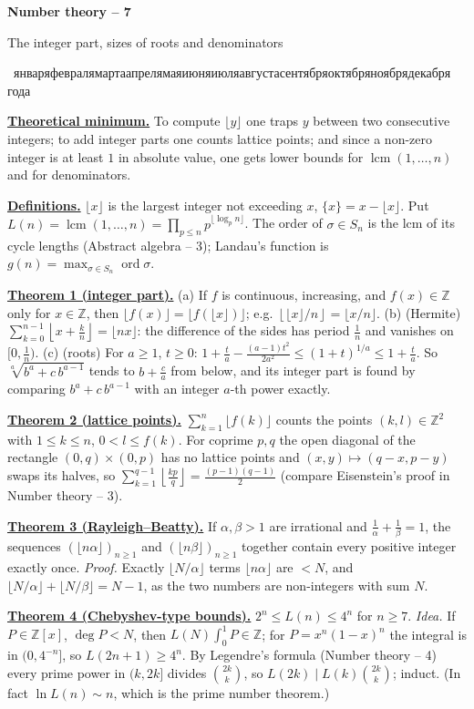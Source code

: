 \documentclass[11pt,a4paper]{article}
\newcommand{\head}[1]{\par\medskip\noindent\textbf{\underline{#1}}\quad}
\newcommand{\rudate}{\number\day~\ifcase\month\or января\or февраля\or марта\or апреля\or мая\or июня\or июля\or августа\or сентября\or октября\or ноября\or декабря\fi~\number\year~года}
\newcommand{\sheettitle}[3]{%
  \begin{center}
  {\huge\bfseries #1\par}\vspace{1.2em}
  {\Large #2\par}\vspace{0.8em}
  \if\relax\detokenize{#3}\relax\else{\Large #3\par}\vspace{0.8em}\fi
  {\foreignlanguage{russian}{\rudate}\par}
  \end{center}\vspace{0.5em}}
\newcommand{\fl}[1]{\left\lfloor #1\right\rfloor}
\DeclareMathOperator{\lcm}{lcm}
\DeclareMathOperator{\ord}{ord}
\begin{document}
\sheettitle{Number theory -- 7}{The integer part, sizes of roots and denominators}{}

\head{Theoretical minimum.} To compute $\lfloor y\rfloor$ one traps $y$ between two
consecutive integers; to add integer parts one counts lattice points; and since a non-zero
integer is at least $1$ in absolute value, one gets lower bounds for $\lcm(1,\dots,n)$ and
for denominators.

\head{Definitions.} $\lfloor x\rfloor$ is the largest integer not exceeding $x$,
$\{x\}=x-\lfloor x\rfloor$. Put $L(n)=\lcm(1,\dots,n)=\prod_{p\leqslant n}p^{\lfloor\log_p n\rfloor}$.
The order of $\sigma\in S_n$ is the lcm of its cycle lengths (Abstract algebra -- 3);
Landau's function is $g(n)=\max_{\sigma\in S_n}\ord\sigma$.

\head{Theorem 1 (integer part).} (a) If $f$ is continuous, increasing, and $f(x)\in\mathbb Z$
only for $x\in\mathbb Z$, then $\lfloor f(x)\rfloor=\lfloor f(\lfloor x\rfloor)\rfloor$; e.g.
$\fl{\lfloor x\rfloor/n}=\lfloor x/n\rfloor$.
(b) (Hermite) $\sum_{k=0}^{n-1}\fl{x+\frac kn}=\lfloor nx\rfloor$: the difference of the sides
has period $\frac1n$ and vanishes on $[0,\frac1n)$.
(c) (roots) For $a\geqslant1$, $t\geqslant0$:
$1+\frac ta-\frac{(a-1)t^2}{2a^2}\leqslant(1+t)^{1/a}\leqslant1+\frac ta$. So
$\sqrt[a]{b^a+c\,b^{a-1}}$ tends to $b+\frac ca$ from below, and its integer part is found by
comparing $b^a+c\,b^{a-1}$ with an integer $a$-th power exactly.

\head{Theorem 2 (lattice points).} $\sum_{k=1}^{n}\lfloor f(k)\rfloor$ counts the points
$(k,l)\in\mathbb Z^2$ with $1\leqslant k\leqslant n$, $0<l\leqslant f(k)$. For coprime $p,q$ the
open diagonal of the rectangle $(0,q)\times(0,p)$ has no lattice points and
$(x,y)\mapsto(q-x,p-y)$ swaps its halves, so
$\sum_{k=1}^{q-1}\fl{\frac{kp}q}=\frac{(p-1)(q-1)}2$ (compare Eisenstein's proof in Number
theory -- 3).

\head{Theorem 3 (Rayleigh--Beatty).} If $\alpha,\beta>1$ are irrational and
$\frac1\alpha+\frac1\beta=1$, the sequences $(\lfloor n\alpha\rfloor)_{n\geqslant1}$ and
$(\lfloor n\beta\rfloor)_{n\geqslant1}$ together contain every positive integer exactly once.
\emph{Proof.} Exactly $\lfloor N/\alpha\rfloor$ terms $\lfloor n\alpha\rfloor$ are $<N$, and
$\lfloor N/\alpha\rfloor+\lfloor N/\beta\rfloor=N-1$, as the two numbers are non-integers with sum $N$.

\head{Theorem 4 (Chebyshev-type bounds).} $2^n\leqslant L(n)\leqslant4^n$ for $n\geqslant7$.
\emph{Idea.} If $P\in\mathbb Z[x]$, $\deg P<N$, then $L(N)\int_0^1P\in\mathbb Z$; for
$P=x^n(1-x)^n$ the integral is in $(0,4^{-n}]$, so $L(2n+1)\geqslant4^n$. By Legendre's
formula (Number theory -- 4) every prime power in $(k,2k]$ divides $\binom{2k}k$, so
$L(2k)\mid L(k)\binom{2k}k$; induct. (In fact $\ln L(n)\sim n$, which is the prime number theorem.)
\end{document}
